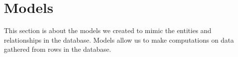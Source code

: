 \section{Models}
\label{sec:models}

This section is about the models we created to mimic the entities and relationships in the database. Models allow us to make computations on data gathered from rows in the database.


